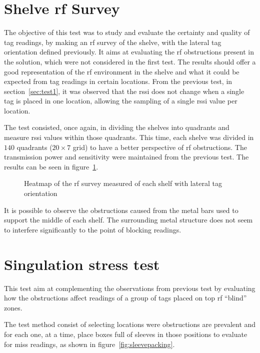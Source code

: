 \section{Shelve \acs{rf} Survey}

The objective of this test was to study and evaluate the certainty and quality of tag readings, by making an \ac{rf} survey of the shelve, with the lateral tag orientation defined previously.
It aims at evaluating the \ac{rf} obstructions present in the solution, which were not considered in the first test.
The results should offer a good representation of the \ac{rf} environment in the shelve and what it could be expected from tag readings in certain locations. 
From the previous test, in section~\ref{sec:test1}, it was observed that the \ac{rssi} does not change when a single tag is placed in one location, allowing the sampling of a single \ac{rssi} value per location. 

The test consisted, once again, in dividing the shelves into quadrants and measure \ac{rssi} values within those quadrants. This time, each shelve was divided in $140$ quadrants ($20\times7$ grid) to have a better perspective of \ac{rf} obstructions. The transmission power and sensitivity were maintained from the previous test.
The results can be seen in figure~\ref{fig:rfsurvey}.

\begin{figure}
    \centering
    \caption{Heatmap of the \ac{rf} survey measured of each shelf with lateral tag orientation}
    \label{fig:rfsurvey}
\end{figure}

It is possible to observe the obstructions caused from the metal bars used to support the middle of each shelf. The surrounding metal structure does not seem to interfere significantly to the point of blocking readings.

\section{Singulation stress test}

This test aim at complementing the observations from previous test by evaluating how the obstructions affect readings of a group of tags placed on top \ac{rf} ``blind'' zones.

The test method consist of selecting locations were obstructions are prevalent and for each one, at a time, place boxes full of sleeves in those positions to evaluate for miss readings, as shown in figure~\ref{fig:sleevepacking}.


